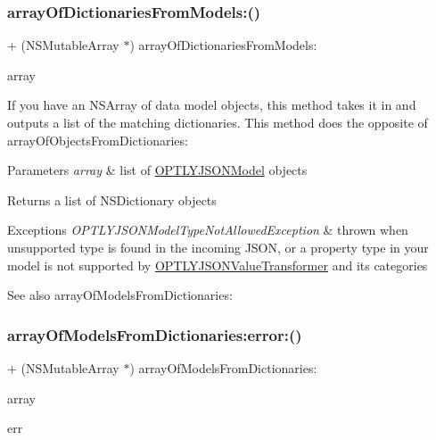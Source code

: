 \subsubsection{\texorpdfstring{array\+Of\+Dictionaries\+From\+Models\+:()}{arrayOfDictionariesFromModels:()}}
{\footnotesize\ttfamily + (N\+S\+Mutable\+Array $\ast$) array\+Of\+Dictionaries\+From\+Models\+: \begin{DoxyParamCaption}\item[{(N\+S\+Array $\ast$)}]{array }\end{DoxyParamCaption}}

If you have an N\+S\+Array of data model objects, this method takes it in and outputs a list of the matching dictionaries. This method does the opposite of array\+Of\+Objects\+From\+Dictionaries\+: 
\begin{DoxyParams}{Parameters}
{\em array} & list of \mbox{\hyperlink{interface_o_p_t_l_y_j_s_o_n_model}{O\+P\+T\+L\+Y\+J\+S\+O\+N\+Model}} objects \\
\hline
\end{DoxyParams}
\begin{DoxyReturn}{Returns}
a list of N\+S\+Dictionary objects 
\end{DoxyReturn}

\begin{DoxyExceptions}{Exceptions}
{\em O\+P\+T\+L\+Y\+J\+S\+O\+N\+Model\+Type\+Not\+Allowed\+Exception} & thrown when unsupported type is found in the incoming J\+S\+ON, or a property type in your model is not supported by \mbox{\hyperlink{interface_o_p_t_l_y_j_s_o_n_value_transformer}{O\+P\+T\+L\+Y\+J\+S\+O\+N\+Value\+Transformer}} and its categories \\
\hline
\end{DoxyExceptions}
\begin{DoxySeeAlso}{See also}
array\+Of\+Models\+From\+Dictionaries\+: 
\end{DoxySeeAlso}
\mbox{\label{interface_o_p_t_l_y_j_s_o_n_model_aa02b3f8f701603689c9a3c4aeb4b8763}} 
\subsubsection{\texorpdfstring{array\+Of\+Models\+From\+Dictionaries\+:error\+:()}{arrayOfModelsFromDictionaries:error:()}}
{\footnotesize\ttfamily + (N\+S\+Mutable\+Array $\ast$) array\+Of\+Models\+From\+Dictionaries\+: \begin{DoxyParamCaption}\item[{(N\+S\+Array $\ast$)}]{array }\item[{error:(N\+S\+Error $\ast$\+\_\+\+\_\+autoreleasing $\ast$)}]{err }\end{DoxyParamCaption}}

